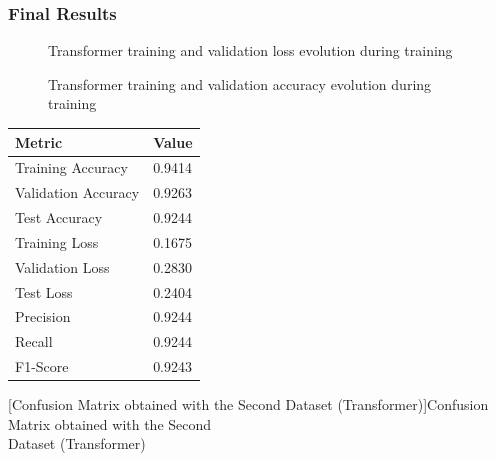 \subsubsection{Final Results}

\begin{figure}[H]
\centerline{}
\caption[Transformer training and validation loss evolution during training]{Transformer training and validation loss evolution during training}
\label{fig:transformer_loss}
\end{figure}

\begin{figure}[H]
\centerline{}
\caption[Transformer training and validation accuracy evolution during training]{Transformer training and validation accuracy evolution during training}
\label{fig:transformer_acc}
\end{figure}

\begin{minipage}{0.35\textwidth}
    \centering
    \captionsetup{justification=centering}
    \label{table:transformer_dataset2_results}
    \begin{tabular}{ |l|l| }
    \hline
    Metric & Value\\
    \hline
    Training Accuracy &  0.9414\\
    \hline
    Validation Accuracy & 0.9263\\
    \hline
    Test Accuracy & 0.9244\\
    \hline
    Training Loss & 0.1675\\
    \hline
    Validation Loss & 0.2830\\
    \hline
    Test Loss & 0.2404\\
    \hline
    Precision & 0.9244\\
    \hline
    Recall & 0.9244\\
    \hline
    F1-Score & 0.9243\\
    \hline
    \end{tabular}
\end{minipage}%
\begin{minipage}{0.65\textwidth}
    \centering
    \captionsetup{justification=centering}
    
    [Confusion Matrix obtained with the Second Dataset (Transformer)]{Confusion Matrix obtained with the Second\\Dataset (Transformer)}
    \label{fig:transformer_dataset2_confusion_matrix}
\end{minipage}

